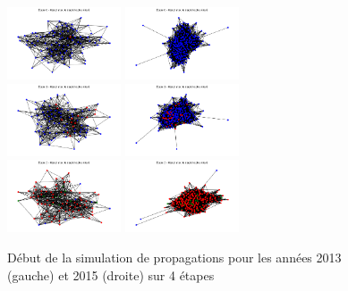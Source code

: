 \documentclass{article}
\begin{document}
\begin{figure}[!h]
    \centering
    \includegraphics[width=0.30\textwidth]{assets/epidemiologie/2013_high_0.png}
    \hfill
    \includegraphics[width=0.30\textwidth]{assets/epidemiologie/2015_high_0.png} \\
    \includegraphics[width=0.30\textwidth]{assets/epidemiologie/2013_high_1.png}
    \hfill
    \includegraphics[width=0.30\textwidth]{assets/epidemiologie/2015_high_1.png} \\
    \includegraphics[width=0.30\textwidth]{assets/epidemiologie/2013_high_3.png}
    \hfill
    \includegraphics[width=0.30\textwidth]{assets/epidemiologie/2015_high_3.png}
    \caption{Début de la simulation de propagations pour les années 2013 (gauche) et 2015 (droite) sur 4 étapes}
    \label{fig:simu_proba_0-3}
\end{figure}
\end{document}
